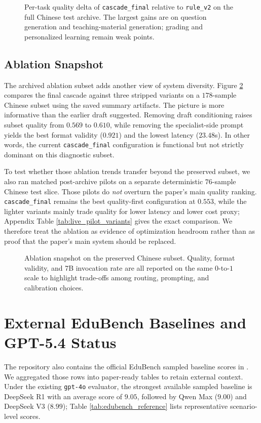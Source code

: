 \documentclass{article}
\begin{document}
\begin{figure}[H]
  \centering
  
  \caption{Per-task quality delta of \texttt{cascade\_final} relative to \texttt{rule\_v2} on the full Chinese test archive. The largest gains are on question generation and teaching-material generation; grading and personalized learning remain weak points.}
  \label{fig:task_delta}
\end{figure}
\FloatBarrier

\subsection{Ablation Snapshot}
The archived ablation subset adds another view of system diversity. Figure \ref{fig:ablation_metrics} compares the final cascade against three stripped variants on a \(178\)-sample Chinese subset using the saved summary artifacts. The picture is more informative than the earlier draft suggested. Removing draft conditioning raises subset quality from \(0.569\) to \(0.610\), while removing the specialist-side prompt yields the best format validity (\(0.921\)) and the lowest latency (\(23.48\)s). In other words, the current \texttt{cascade\_final} configuration is functional but not strictly dominant on this diagnostic subset.

To test whether those ablation trends transfer beyond the preserved subset, we also ran matched post-archive pilots on a separate deterministic \(76\)-sample Chinese test slice. Those pilots do \emph{not} overturn the paper's main quality ranking. \texttt{cascade\_final} remains the best quality-first configuration at \(0.553\), while the lighter variants mainly trade quality for lower latency and lower cost proxy; Appendix Table \ref{tab:live_pilot_variants} gives the exact comparison. We therefore treat the ablation as evidence of optimization headroom rather than as proof that the paper's main system should be replaced.

\begin{figure}[H]
  \centering
  
  \caption{Ablation snapshot on the preserved Chinese subset. Quality, format validity, and 7B invocation rate are all reported on the same \(0\)-to-\(1\) scale to highlight trade-offs among routing, prompting, and calibration choices.}
  \label{fig:ablation_metrics}
\end{figure}
\FloatBarrier

\section{External EduBench Baselines and GPT-5.4 Status}
The repository also contains the official EduBench sampled baseline scores in . We aggregated those rows into paper-ready tables to retain external context. Under the existing \texttt{gpt-4o} evaluator, the strongest available sampled baseline is DeepSeek R1 with an average score of \(9.05\), followed by Qwen Max (\(9.00\)) and DeepSeek V3 (\(8.99\)); Table \ref{tab:edubench_reference} lists representative scenario-level scores.
\end{document}
